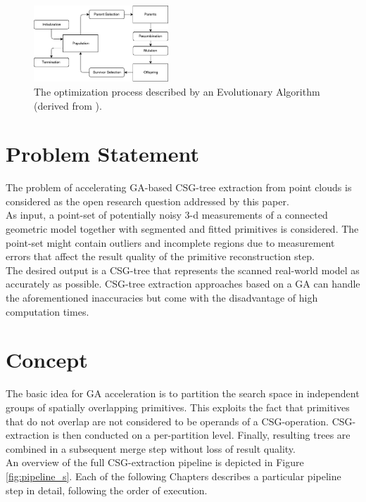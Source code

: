 \begin{figure}[htb]
	\centering
	\includegraphics[width=0.45\textwidth]{figures/evo.pdf}
	\caption{The optimization process described by an Evolutionary Algorithm (derived from \cite{eiben2003introduction}).}
	\label{fig:evo}
\end{figure}

\section{Problem Statement}
The problem of accelerating \ac{GA}-based \ac{CSG}-tree extraction from point clouds is considered as the open research question addressed by this paper.
\\
As input, a point-set of potentially noisy $3$-d measurements of a connected geometric model together with segmented and fitted primitives is considered. 
The point-set might contain outliers and incomplete regions due to measurement errors that affect the result quality of the primitive reconstruction step.
\\
The desired output is a \ac{CSG}-tree that represents the scanned real-world model as accurately as possible.
\ac{CSG}-tree extraction approaches based on a \ac{GA} \cite{fayolle2016evolutionary} can handle the aforementioned inaccuracies but come with the disadvantage of high computation times.

\section{Concept}
The basic idea for \ac{GA} acceleration is to partition the search space in independent groups of spatially overlapping primitives.
This exploits the fact that primitives that do not overlap are not considered to be operands of a \ac{CSG}-operation.
\ac{CSG}-extraction is then conducted on a per-partition level. 
Finally, resulting trees are combined in a subsequent merge step without loss of result quality. 
\\
An overview of the full \ac{CSG}-extraction pipeline is depicted in Figure \ref{fig:pipeline_s}. 
Each of the following Chapters describes a particular pipeline step in detail, following the order of execution.

